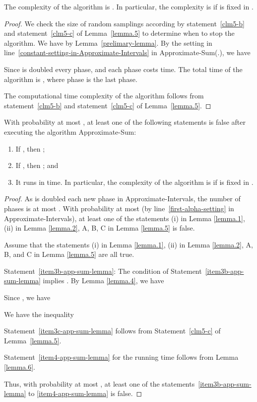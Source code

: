 \documentclass[runningheads]{llncs}
\begin{document}
\begin{lemma}\label{lemma.6}
The complexity of the algorithm is . In particular, the complexity is
 if 
 is fixed in .
\end{lemma}


\begin{proof} We check the size  of random samplings according by statement~\ref{clm5-b} and statement~\ref{clm5-c} of
Lemma~\ref{lemma.5} to determine when to stop the algorithm. We have
 by
Lemma~\ref{prelimary-lemma}. By the setting in
line~\ref{constant-setting-in-Approximate-Intervals} in
Approximate-Sum(.), we have



 Since  is doubled every phase,
and each  phase  costs  time. The total time of the
algorithm is , where phase  is the
last phase.


 The computational time complexity
   of the algorithm follows from statement~\ref{clm5-b} and statement~\ref{clm5-c} of
Lemma~\ref{lemma.5}.
\end{proof}



\begin{lemma}\label{app-sum-lemma} With probability at most
, at least one of the following statements is false after
executing the algorithm Approximate-Sum:
\begin{enumerate}[1.]
\item\label{item3b-app-sum-lemma}
If , then ;
\item\label{item3c-app-sum-lemma}
If , then ; and
\item\label{item4-app-sum-lemma}
It runs in  time. In particular, the complexity
of the algorithm is 
if  is fixed in .
\end{enumerate}
\end{lemma}



\begin{proof}
As  is doubled each new phase in Approximate-Intervals,
the number of phases is at most . With probability at most
 (by line~\ref{first-alpha-setting}
in Approximate-Intervals), at least one of the statements (i)
in Lemma \ref{lemma.1}, (ii) in Lemma \ref{lemma.2}, A, B, C in
Lemma \ref{lemma.5} is false.




Assume that the statements (i) in Lemma \ref{lemma.1}, (ii) in Lemma
\ref{lemma.2}, A, B, and C in Lemma \ref{lemma.5} are all true.


Statement~\ref{item3b-app-sum-lemma}: The condition of Statement~\ref{item3b-app-sum-lemma} implies . By Lemma \ref{lemma.4},  we have


 Since
, we have

We have the inequality


 Statement~\ref{item3c-app-sum-lemma} follows from
Statement~\ref{clm5-c} of Lemma~\ref{lemma.5}.


Statement~\ref{item4-app-sum-lemma} for the running time follows
from Lemma \ref{lemma.6}.

 Thus,
with probability at  most , at least one of the
statements~\ref{item3b-app-sum-lemma} to \ref{item4-app-sum-lemma}
is false.
\end{proof}
\end{document}
